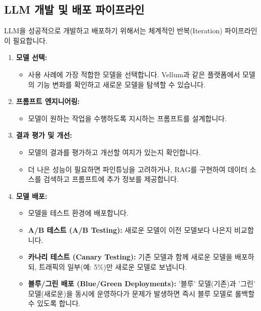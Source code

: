 \documentclass[11pt,a4paper]{article}
\begin{document}
\subsection{LLM 개발 및 배포 파이프라인}

LLM을 성공적으로 개발하고 배포하기 위해서는 체계적인 반복(Iteration) 파이프라인이 필요합니다.

\begin{enumerate}
    \item \textbf{모델 선택:}
    \begin{itemize}
        \item 사용 사례에 가장 적합한 모델을 선택합니다. Vellum과 같은 플랫폼에서 모델의 기능 변화를 확인하고 새로운 모델을 탐색할 수 있습니다.
    \end{itemize}

    \item \textbf{프롬프트 엔지니어링:}
    \begin{itemize}
        \item 모델이 원하는 작업을 수행하도록 지시하는 프롬프트를 설계합니다.
    \end{itemize}

    \item \textbf{결과 평가 및 개선:}
    \begin{itemize}
        \item 모델의 결과를 평가하고 개선할 여지가 있는지 확인합니다.
        \item 더 나은 성능이 필요하면 파인튜닝을 고려하거나, RAG를 구현하여 데이터 소스를 검색하고 프롬프트에 추가 정보를 제공합니다.
    \end{itemize}

    \item \textbf{모델 배포:}
    \begin{itemize}
        \item 모델을 테스트 환경에 배포합니다.
        \item \textbf{A/B 테스트 (A/B Testing):} 새로운 모델이 이전 모델보다 나은지 비교합니다.
        \item \textbf{카나리 테스트 (Canary Testing):} 기존 모델과 함께 새로운 모델을 배포하되, 트래픽의 일부(예: 5\%)만 새로운 모델로 보냅니다.
        \item \textbf{블루/그린 배포 (Blue/Green Deployments):} '블루' 모델(기존)과 '그린' 모델(새로운)을 동시에 운영하다가 문제가 발생하면 즉시 블루 모델로 롤백할 수 있도록 합니다.
    \end{itemize}
\end{enumerate}
\end{document}
